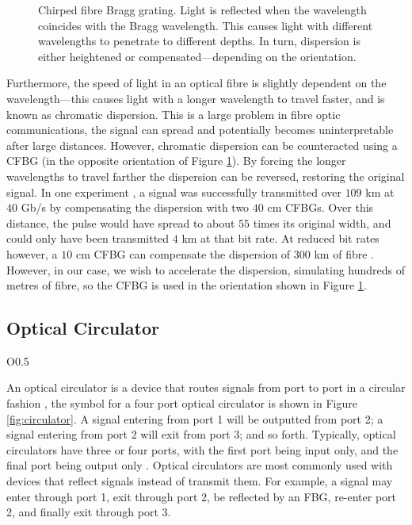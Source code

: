 \begin{figure}[tbp]
\centering

\caption[Chirped fibre Bragg grating.]{Chirped fibre Bragg grating. Light is reflected when the wavelength coincides with the Bragg wavelength. This causes light with different wavelengths to penetrate to different depths. In turn, dispersion is either heightened or compensated---depending on the orientation.}
\label{fig:cfbg}
\end{figure}

Furthermore, the speed of light in an optical fibre is slightly dependent on the wavelength---this causes light with a longer wavelength to travel faster, and is known as chromatic dispersion. This is a large problem in fibre optic communications, the signal can spread and potentially becomes uninterpretable after large distances. However, chromatic dispersion can be counteracted using a CFBG \cite{agrawal2002, alazzawi, becker, starodoumov} (in the opposite orientation of Figure \ref{fig:cfbg}). By forcing the longer wavelengths to travel farther the dispersion can be reversed, restoring the original signal. In one experiment \cite{dong}, a signal was successfully transmitted over $109$ km at $40$ Gb/s by compensating the dispersion with two  $40$ cm CFBGs. Over this distance, the pulse would have spread to about $55$ times its original width, and could only have been transmitted $4$ km at that bit rate. At reduced bit rates however, a $10$ cm CFBG can compensate the dispersion of $300$ km of fibre \cite{agrawal2002}. However, in our case, we wish to accelerate the dispersion, simulating hundreds of metres of fibre, so the CFBG is used in the orientation shown in Figure \ref{fig:cfbg}. \\

\subsection{Optical Circulator}
\begin{wrapfigure}{O}{0.5\textwidth}
\centering

\caption{Symbol for a four port optical circulator.}
\label{fig:circulator}
\end{wrapfigure}
An optical circulator is a device that routes signals from port to port in a circular fashion \cite{agrawal2002, alazzawi, becker}, the symbol for a four port optical circulator is shown in Figure \ref{fig:circulator}. A signal entering from port 1 will be outputted from port 2; a signal entering from port 2 will exit from port 3; and so forth. Typically, optical circulators have three or four ports, with the first port being input only, and the final port being output only \cite{alazzawi}. Optical circulators are most commonly used with devices that reflect signals instead of transmit them. For example, a signal may enter through port 1, exit through port 2, be reflected by an FBG, re-enter port 2, and finally exit through port 3. \\

